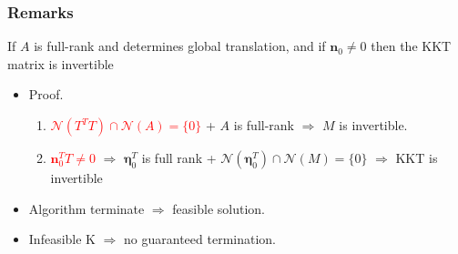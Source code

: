 \documentclass[serif,mathserif]{beamer}
\newcommand{\BOLD}[1]{\mathbf{#1}}
\newcommand{\BOLDG}[1]{\boldsymbol{#1}}
\newcommand{\TODO}[1]{\textcolor{red}{#1}}
\begin{document}
\begin{frame}
 \frametitle{Remarks}
  \begin{theo}
    If $A$ is full-rank and determines global translation, and if $\BOLD{n}_0 \neq 0$ then the KKT matrix is invertible
  \end{theo}
  \begin{itemize}
    \item Proof. 
    \begin{enumerate}
     \item \TODO{$\mathcal{N}(T^TT) \cap \mathcal{N}(A) = \{0\}$} + $A$ is full-rank $\Rightarrow$ $M$ is invertible.
     \item \TODO{$\BOLD{n}_0^TT \neq 0$} $\Rightarrow$ $\BOLDG{\eta}^T_0$ is full rank + $\mathcal{N}(\BOLDG{\eta}_0^T) \cap \mathcal{N}(M) = \{0\}$
     $\Rightarrow$ KKT is invertible
    \end{enumerate}
  \end{itemize}
  \begin{itemize}
   \item Algorithm terminate $\Rightarrow$ feasible solution.
   \item Infeasible K $\Rightarrow$ no guaranteed termination.
  \end{itemize}
\end{frame}
\end{document}
